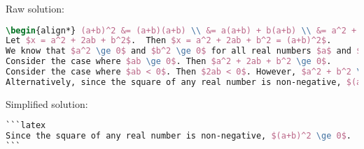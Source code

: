 \documentclass{article}
\begin{document}



Raw solution:
\begin{tcolorbox}[colback=blue!10, width=\linewidth]
    \begin{lstlisting}[language=LaTeX]
\begin{align*} (a+b)^2 &= (a+b)(a+b) \\ &= a(a+b) + b(a+b) \\ &= a^2 + ab + ba + b^2 \\ &= a^2 + 2ab + b^2\end{align*} 
Let $x = a^2 + 2ab + b^2$.  Then $x = a^2 + 2ab + b^2 = (a+b)^2$.
We know that $a^2 \ge 0$ and $b^2 \ge 0$ for all real numbers $a$ and $b$.
Consider the case where $ab \ge 0$. Then $a^2 + 2ab + b^2 \ge 0$.
Consider the case where $ab < 0$. Then $2ab < 0$. However, $a^2 + b^2 \ge 0$.  If $a^2 + b^2 \ge |2ab|$, then $a^2 + 2ab + b^2 \ge 0$.  If $a^2 + b^2 < |2ab|$, then we can rewrite $a^2 + 2ab + b^2 = a^2 + 2ab + b^2$. Then we have $a^2 + b^2 \ge 0$ and $a^2 + 2ab + b^2 = (a+b)^2$. Since the square of any real number is non-negative, $(a+b)^2 \ge 0$.
Alternatively, since the square of any real number is non-negative, $(a+b)^2 \ge 0$.

\end{lstlisting}
\end{tcolorbox}

Simplified solution:
\begin{tcolorbox}[colback=blue!10, width=\linewidth]
    \begin{lstlisting}[language=LaTeX]
```latex
Since the square of any real number is non-negative, $(a+b)^2 \ge 0$.
```

\end{lstlisting}
\end{tcolorbox}
\end{document}
